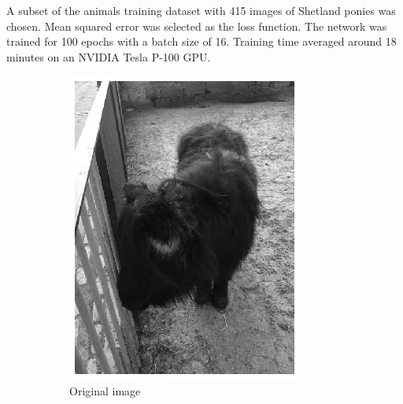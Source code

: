 \documentclass{l4proj}
\begin{document}
A subset of the animals training dataset with 415 images of Shetland ponies was chosen. Mean squared error was selected as the loss function. The network was trained for 100 epochs with a batch size of 16. Training time averaged around 18 minutes on an NVIDIA Tesla P-100 GPU.

\begin{figure}[ht]
  \centering
  \begin{subfigure}[h!]{0.22\textwidth}
    \includegraphics[width=\textwidth]{images/autoencoder/train/gray.png}
    \caption{Original image}
  \end{subfigure}
  \begin{subfigure}[h!]{0.22\textwidth}

\end{subfigure}
\end{figure}
\end{document}

